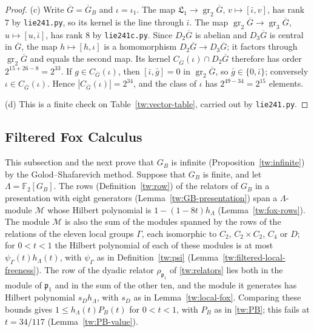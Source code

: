 \documentclass[11pt]{amsart}
\numberwithin{equation}{section}
\theoremstyle{definition}
\theoremstyle{remark}
\newcommand{\Ftwo}{\mathbb F_2}
\begin{document}
\begin{proof}
(c) Write $\overline G=\overline G_B$ and $\iota=\iota_1$. The map
$\mathfrak L_1\to\operatorname{gr}_2\overline G$, $v\mapsto[\bar\iota,v]$, has
rank $7$ by \texttt{lie241.py}, so its kernel is the line through
$\bar\iota$. The map
$\operatorname{gr}_2\overline G\to\operatorname{gr}_3\overline G$,
$u\mapsto[u,\bar\iota]$, has rank $8$ by \texttt{lie241c.py}. Since
$D_2\overline G$ is abelian and $D_3\overline G$ is central in $\overline G$,
the map $h\mapsto[h,\iota]$ is a homomorphism $D_2\overline G\to D_3\overline G$;
it factors through $\operatorname{gr}_2\overline G$ and equals the second map.
Its kernel $C_{\overline G}(\iota)\cap D_2\overline G$ therefore has order
$2^{15+26-8}=2^{33}$. If $g\in C_{\overline G}(\iota)$, then
$[\bar\iota,\bar g]=0$ in $\operatorname{gr}_2\overline G$, so
$\bar g\in\{0,\bar\iota\}$; conversely $\iota\in C_{\overline G}(\iota)$.
Hence $|C_{\overline G}(\iota)|=2^{34}$, and the class of $\iota$ has
$2^{49-34}=2^{15}$ elements.

(d) This is a finite check on Table~\ref{tw:vector-table}, carried out by
\texttt{lie241.py}.
\end{proof}

\subsection{Filtered Fox Calculus}\label{tw:fox-section}
This subsection and the next prove that $G_B$ is infinite
(Proposition~\ref{tw:infinite}) by the Golod--Shafarevich method. Suppose
that $G_B$ is finite, and let $\Lambda=\Ftwo[G_B]$. The rows
(Definition~\ref{tw:row}) of the relators of $G_B$ in a presentation with
eight generators (Lemma~\ref{tw:GB-presentation}) span a $\Lambda$-module
$\mathcal M$ whose Hilbert polynomial is $1-(1-8t)h_\Lambda$
(Lemma~\ref{tw:fox-rows}). The module $\mathcal M$ is also the sum of the
modules spanned by the rows of the relations of the eleven local groups
$\Gamma$, each isomorphic to $C_2$, $C_2\times C_2$, $C_4$ or $D$; for $0<t<1$
the Hilbert polynomial of each of these modules is at most
$\psi_\Gamma(t)h_\Lambda(t)$, with $\psi_\Gamma$ as in
Definition~\ref{tw:psi} (Lemma~\ref{tw:filtered-local-freeness}). The row of
the dyadic relator $\rho_{\mathfrak p_1}$ of \eqref{tw:relators} lies both in
the module of $\mathfrak p_1$ and in the sum of the other ten, and the module
it generates has Hilbert polynomial $s_Dh_\Lambda$, with $s_D$ as in
Lemma~\ref{tw:local-fox}. Comparing these bounds gives
$1\le h_\Lambda(t)P_B(t)$ for $0<t<1$, with $P_B$ as in \eqref{tw:PB}; this
fails at $t=34/117$ (Lemma~\ref{tw:PB-value}).
\end{document}
